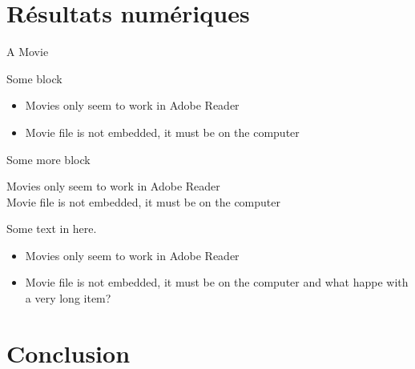 \documentclass[utf8, a4paper]{beamer}
\begin{document}
\section{Résultats numériques}
\begin{frame}{A Movie}

  \begin{block} {Some block}

    \begin{itemize}
    \item Movies only seem to work in Adobe Reader
    \item Movie file is not embedded, it must be on the computer
    \end{itemize}
  \end{block}

  \pause
  \begin{alertblock}
    {Some more block}

    Movies only seem to work in Adobe Reader\\
    Movie file is not embedded, it must be on the computer
  \end{alertblock}
  \pause

  \begin{exampleblock}{}
    Some text in here.

    \begin{itemize}[<+->]
    \item Movies only seem to work in Adobe Reader
    \item Movie file is not embedded, it must be on the computer and
      what happe with a very long item?
    \end{itemize}
  \end{exampleblock}
\end{frame}


\section
  {Conclusion}
\end{document}
